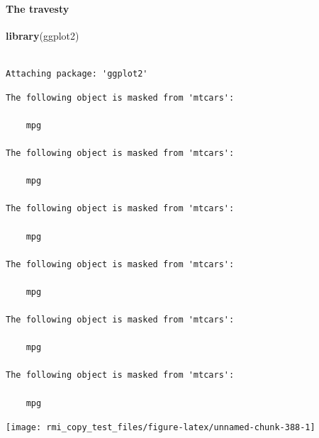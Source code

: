 \documentclass[]{book}
\newenvironment{Shaded}{\begin{snugshade}}{\end{snugshade}}
\newcommand{\DataTypeTok}[1]{\textcolor[rgb]{0.13,0.29,0.53}{#1}}
\newcommand{\KeywordTok}[1]{\textcolor[rgb]{0.13,0.29,0.53}{\textbf{#1}}}
\newcommand{\NormalTok}[1]{#1}
\newcommand{\OperatorTok}[1]{\textcolor[rgb]{0.81,0.36,0.00}{\textbf{#1}}}
\newcommand{\StringTok}[1]{\textcolor[rgb]{0.31,0.60,0.02}{#1}}
\let\oldparagraph\paragraph
\renewcommand{\paragraph}[1]{\oldparagraph{#1}\mbox{}}
\theoremstyle{definition}
\theoremstyle{definition}
\theoremstyle{definition}
\theoremstyle{remark}
\begin{document}
\hypertarget{the-travesty}{%
\paragraph{The travesty}\label{the-travesty}}

\begin{Shaded}
\begin{Highlighting}[]
\KeywordTok{library}\NormalTok{(ggplot2)}
\end{Highlighting}
\end{Shaded}

\begin{verbatim}

Attaching package: 'ggplot2'
\end{verbatim}

\begin{verbatim}
The following object is masked from 'mtcars':

    mpg

The following object is masked from 'mtcars':

    mpg

The following object is masked from 'mtcars':

    mpg

The following object is masked from 'mtcars':

    mpg

The following object is masked from 'mtcars':

    mpg

The following object is masked from 'mtcars':

    mpg
\end{verbatim}

\begin{Shaded}
\end{Shaded}

\begin{center}\texttt{[image: rmi\_copy\_test\_files/figure-latex/unnamed-chunk-388-1]} \end{center}
\end{document}
